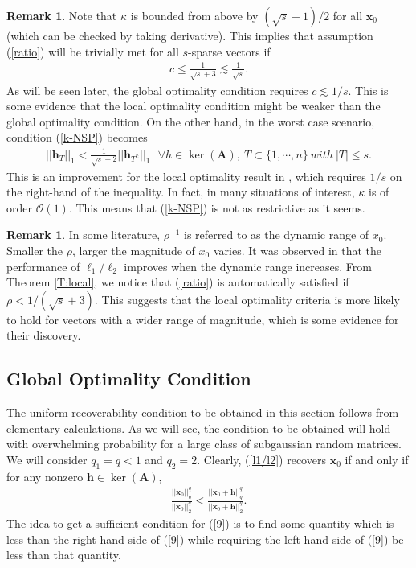 \documentclass[11pt]{article}
\numberwithin{equation}{section}
\theoremstyle{plain}
\theoremstyle{definition}
\newtheorem{Rem}[Th]{Remark}
\def\A{{\mathbf A}}
\def\x{{\mathbf x}}
\def\h{{\mathbf{h}}}
\begin{document}
\begin{Rem}
Note that $\kappa$ is bounded from above by $(\sqrt{s}+1)/2$ for all $\x_0$ (which can be checked by taking derivative). This implies that assumption (\ref{ratio}) will be trivially met for all $s$-sparse vectors if 
\begin{align*}
c\leq\frac{1}{\sqrt{s}+3}\lesssim\frac{1}{\sqrt{s}}. 
\end{align*}
As will be seen later, the global optimality condition requires $c\lesssim 1/s$. This is some evidence that the local optimality condition might be weaker than the global optimality condition. On the other hand, in the worst case scenario, condition (\ref{k-NSP})  becomes
\begin{align*}
||\h_T||_1<\frac{1}{\sqrt{s}+2}||\h_{T^\complement}||_1\ \ \ \forall h\in\ker(\A), \ T\subset\{1, \cdots, n\}\ with\ |T|\leq s. 
\end{align*}
This is an improvement for the local optimality result in \cite{rahimi2018scale}, which requires $1/s$ on the right-hand of the inequality. In fact, in many situations of interest, $\kappa$ is of order $\mathcal{O}(1)$. This means that (\ref{k-NSP}) is not as restrictive as it seems.    
\end{Rem}

\begin{Rem}
In some literature, $\rho^{-1}$ is referred to as the dynamic range of $x_0$. Smaller the $\rho$, larger the magnitude of $x_0$ varies. It was observed in \cite{rahimi2018scale} that the performance of $\ell_1/\ell_2$ improves when the dynamic range increases. From Theorem \ref{T:local}, we notice that  (\ref{ratio}) is automatically satisfied if $\rho<1/(\sqrt{s}+3)$. This suggests that the local optimality criteria is more likely to hold for vectors with a wider range of magnitude, which is some evidence for their discovery. 
\end{Rem} 


\subsection{Global Optimality Condition}

The uniform recoverability condition to be obtained in this section follows from elementary calculations. As we will see, the condition to be obtained will hold with overwhelming probability for a large class of subgaussian random matrices. We will consider $q_1=q<1$ and $q_2=2$. Clearly, (\ref{l1/l2}) recovers $\x_0$ if and only if for any nonzero $\h\in \ker(\A)$,
\begin{align}
\frac{||\x_0||^q_q}{||\x_0||^q_2}<\frac{||\x_0+\h||^q_q}{||\x_0+\h||^q_2}.\label{9}
\end{align}
The idea to get a sufficient condition for (\ref{9}) is to find some quantity which is less than the right-hand side of (\ref{9}) while requiring the left-hand side of (\ref{9}) be less than that quantity.     
\end{document}
